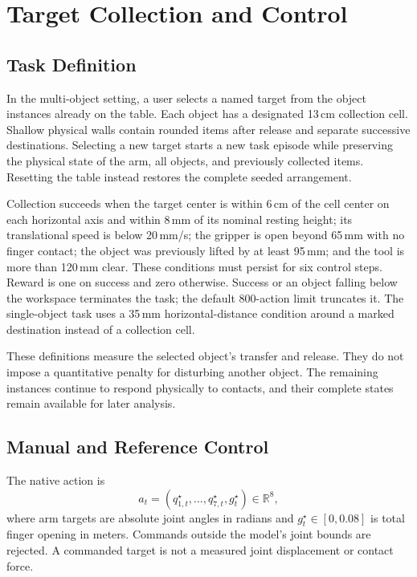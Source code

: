 \documentclass[10pt]{article}
\begin{document}
\section{Target Collection and Control}
\subsection{Task Definition}
In the multi-object setting, a user selects a named target from the object instances already on the table. Each object has a designated 13\,cm collection cell. Shallow physical walls contain rounded items after release and separate successive destinations. Selecting a new target starts a new task episode while preserving the physical state of the arm, all objects, and previously collected items. Resetting the table instead restores the complete seeded arrangement.

Collection succeeds when the target center is within 6\,cm of the cell center on each horizontal axis and within 8\,mm of its nominal resting height; its translational speed is below 20\,mm/s; the gripper is open beyond 65\,mm with no finger contact; the object was previously lifted by at least 95\,mm; and the tool is more than 120\,mm clear. These conditions must persist for six control steps. Reward is one on success and zero otherwise. Success or an object falling below the workspace terminates the task; the default 800-action limit truncates it. The single-object task uses a 35\,mm horizontal-distance condition around a marked destination instead of a collection cell.

These definitions measure the selected object's transfer and release. They do not impose a quantitative penalty for disturbing another object. The remaining instances continue to respond physically to contacts, and their complete states remain available for later analysis.

\subsection{Manual and Reference Control}
The native action is
\begin{equation}
 a_t=(q^{\star}_{1,t},\ldots,q^{\star}_{7,t},g^{\star}_t)\in\mathbb{R}^{8},
\end{equation}
where arm targets are absolute joint angles in radians and $g^{\star}_t\in[0,0.08]$ is total finger opening in meters. Commands outside the model's joint bounds are rejected. A commanded target is not a measured joint displacement or contact force.
\end{document}
